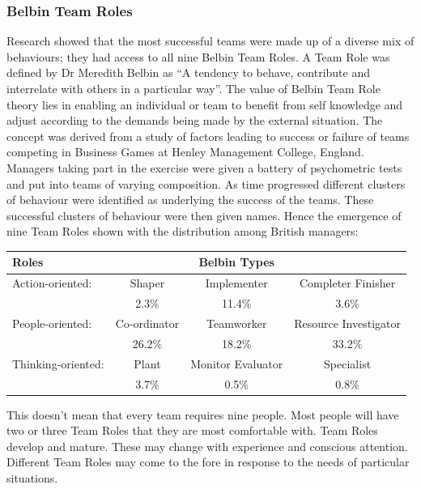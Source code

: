 \documentclass[]{book}
\begin{document}
\hypertarget{belbin-team-roles}{%
\subsubsection{Belbin Team Roles}\label{belbin-team-roles}}

Research showed that the most successful teams were made up of a diverse mix of behaviours; they had access to all nine Belbin Team Roles. A Team Role was defined by Dr Meredith Belbin as ``A tendency to behave, contribute and interrelate with others in a particular way''. The value of Belbin Team Role theory lies in enabling an individual or team to benefit from self knowledge and adjust according to the demands being made by the external situation. \citep{Belbin2010} The concept was derived from a study of factors leading to success or failure of teams competing in
Business Games at Henley Management College, England. Managers taking part in the exercise
were given a battery of psychometric tests and put into teams of varying composition. As time
progressed different clusters of behaviour were identified as underlying the success of the teams. These successful clusters of behaviour were then given names. Hence the emergence of nine Team Roles shown with the distribution among British managers: \citep{Fisher1998}

\begin{longtable}[]{@{}lccc@{}}
\toprule
Roles & & Belbin Types &\tabularnewline
\midrule
\endhead
Action-oriented: & Shaper & Implementer & Completer Finisher\tabularnewline
& 2.3\% & 11.4\% & 3.6\%\tabularnewline
People-oriented: & Co-ordinator & Teamworker & Resource Investigator\tabularnewline
& 26.2\% & 18.2\% & 33.2\%\tabularnewline
Thinking-oriented: & Plant & Monitor Evaluator & Specialist\tabularnewline
& 3.7\% & 0.5\% & 0.8\%\tabularnewline
\bottomrule
\end{longtable}

This doesn't mean that every team requires nine people. Most people will have two or three Team Roles that they are most comfortable with. Team Roles develop and mature. These may change with experience and conscious attention. Different Team Roles may come to the fore in response to the needs of particular situations.
\end{document}
